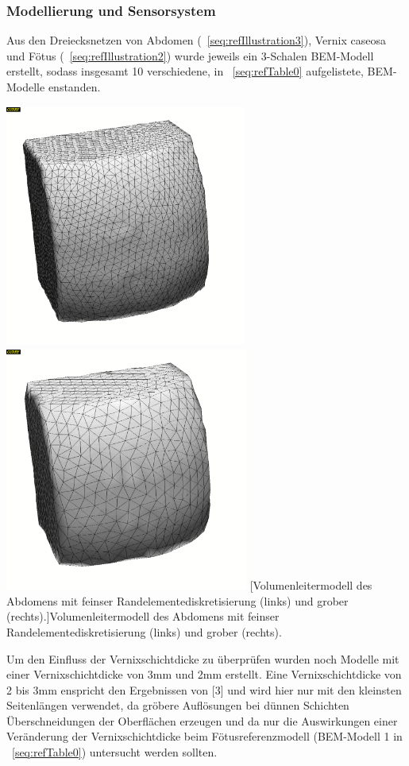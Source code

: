 \subsubsection{Modellierung und Sensorsystem}
Aus den Dreiecksnetzen von Abdomen
(\figurename~\ref{seq:refIllustration3}), Vernix caseosa und Fötus
(\figurename~\ref{seq:refIllustration2}) wurde jeweils ein 3-Schalen
BEM-Modell erstellt, sodass insgesamt 10 verschiedene, in
\tablename~\ref{seq:refTable0} aufgelistete, BEM-Modelle enstanden.



\begin{center}
\includegraphics[width=7.92cm,height=7.99cm]{BA-img/BA-img6.pdf}\includegraphics[width=7.99cm,height=7.99cm]{BA-img/BA-img7.pdf}
[Volumenleitermodell des Abdomens mit feinser
Randelementediskretisierung (links) und grober
(rechts).]{Volumenleitermodell des Abdomens mit feinser
Randelementediskretisierung (links) und grober (rechts).}
\label{seq:refIllustration3}

\end{center}
Um den Einfluss der Vernixschichtdicke zu überprüfen wurden noch Modelle
mit einer Vernixschichtdicke von 3mm und 2mm erstellt. Eine
Vernixschichtdicke von 2 bis 3mm enspricht den Ergebnissen von [3] und
wird hier nur mit den kleinsten Seitenlängen verwendet, da gröbere
Auflösungen bei dünnen Schichten Überschneidungen der Oberflächen
erzeugen und da nur die Auswirkungen einer Veränderung der
Vernixschichtdicke beim Fötusreferenzmodell (BEM-Modell 1 in
\tablename~\ref{seq:refTable0}) untersucht werden sollten.

